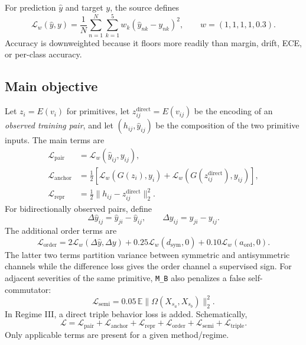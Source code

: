 \documentclass[11pt,a4paper]{article}
\newcommand{\E}{\mathbb{E}}
\newcommand{\MB}{\texttt{M\_B}}
\begin{document}
For prediction $\hat y$ and target $y$, the source defines
\begin{equation}
\mathcal{L}_w(\hat y,y)=
\frac1N\sum_{n=1}^N\sum_{k=1}^{5}w_k(\hat y_{nk}-y_{nk})^2,
\qquad
w=(1,1,1,1,0.3).
\label{eq:wmse}
\end{equation}
Accuracy is downweighted because it floors more readily than margin, drift,
ECE, or per-class accuracy.

\subsection{Main objective}

Let $z_i=E(v_i)$ for primitives, let $z_{ij}^{\mathrm{direct}}=E(v_{ij})$ be the
encoding of an \emph{observed training pair}, and let
$(h_{ij},\hat y_{ij})$ be the composition of the two primitive inputs.  The
main terms are
\begin{align}
\mathcal{L}_{\mathrm{pair}}&=\mathcal{L}_w(\hat y_{ij},y_{ij}),\\
\mathcal{L}_{\mathrm{anchor}}&=\tfrac12\left[
\mathcal{L}_w(G(z_i),y_i)+
\mathcal{L}_w(G(z_{ij}^{\mathrm{direct}}),y_{ij})\right],\\
\mathcal{L}_{\mathrm{repr}}&=\tfrac12\|h_{ij}-z_{ij}^{\mathrm{direct}}\|_2^2.
\end{align}
For bidirectionally observed pairs, define
\[
\Delta\hat y_{ij}=\hat y_{ji}-\hat y_{ij},
\qquad
\Delta y_{ij}=y_{ji}-y_{ij}.
\]
The additional order terms are
\begin{equation}
\mathcal{L}_{\mathrm{order}}
=2\mathcal{L}_w(\Delta\hat y,\Delta y)
+0.25\mathcal{L}_w(d_{\mathrm{sym}},0)
+0.10\mathcal{L}_w(a_{\mathrm{ord}},0).
\end{equation}
The latter two terms partition variance between symmetric and antisymmetric
channels while the difference loss gives the order channel a supervised sign.
For adjacent severities of the same primitive, \MB{} also penalizes a false
self-commutator:
\begin{equation}
\mathcal{L}_{\mathrm{semi}}=0.05\,\E\|\Omega(X_{s_a},X_{s_b})\|_2^2.
\end{equation}
In Regime III, a direct triple behavior loss is added.  Schematically,
\begin{equation}
\mathcal{L}=\mathcal{L}_{\mathrm{pair}}+
\mathcal{L}_{\mathrm{anchor}}+\mathcal{L}_{\mathrm{repr}}+
\mathcal{L}_{\mathrm{order}}+
\mathcal{L}_{\mathrm{semi}}+
\mathcal{L}_{\mathrm{triple}}.
\label{eq:loss}
\end{equation}
Only applicable terms are present for a given method/regime.
\end{document}
